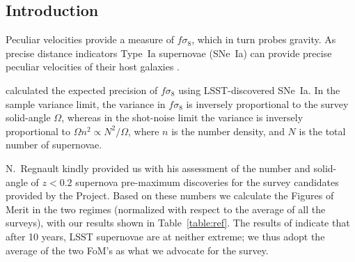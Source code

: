 \documentclass{aastex62}   	%
\begin{document}
\subsection{Introduction}
Peculiar velocities provide a measure of $f\sigma_8$, which in turn probes gravity.  As precise distance indicators Type~Ia supernovae (SNe~Ia)
can provide precise peculiar velocities of their host galaxies \citep{2006PhRvD..73l3526H,2011ApJ...741...67D}.

\citet{2017ApJ...847..128H} calculated the  expected precision of $f\sigma_8$ using LSST-discovered SNe~Ia.
In the sample variance limit, the variance in $f\sigma_8$ is inversely proportional to the survey solid-angle $\Omega$, whereas
in the shot-noise limit the variance is inversely proportional to $\Omega n^2 \propto N^2/\Omega$, where $n$ is the number density,
and $N$ is the total number of supernovae.  

N.~Regnault kindly provided us with his assessment of the number and solid-angle of $z<0.2$ supernova pre-maximum discoveries 
for the survey candidates provided by the Project.  Based on these numbers we calculate the Figures of Merit in the two regimes 
(normalized with respect to the average of all the surveys),
with our results shown in 
Table~\ref{table:ref}.  The results of \citet{2017ApJ...847..128H}  indicate that after 10 years,
LSST supernovae are at neither extreme; we thus adopt the average of the two FoM's as what we advocate for the survey.
\end{document}
